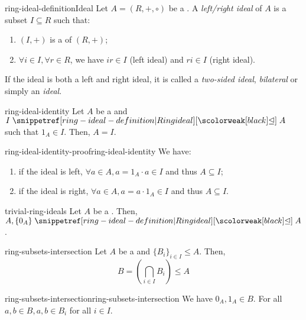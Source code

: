 \documentclass[preview]{standalone}
\begin{document}
\begin{snippetdefinition}{ring-ideal-definition}{Ideal}
    Let \(A = (R, +, \circ)\) be a \ring.
    A \emph{left/right ideal} of \(A\) is a subset \(I \subseteq R\)
    such that:
    \begin{enumerate}
        \item \((I, +)\) is a \subgroup of \((R, +)\);
        \item \(\forall i \in I, \forall r \in R\), we have \(ir \in I\) (left ideal) and \(ri \in I\) (right ideal).
    \end{enumerate}
    If the ideal is both a left and right ideal, it is called a
    \emph{two-sided ideal}, \emph{bilateral} or simply an \emph{ideal}.
\end{snippetdefinition}


\begin{snippetproposition}{ring-ideal-identity}{}
    Let \(A\) be a \ring and \(I \idealin A\) such that \(1_A \in I\).
    Then, \(A = I\).
\end{snippetproposition}

\begin{snippetproof}{ring-ideal-identity-proof}{ring-ideal-identity}{}
    We have:
    \begin{enumerate}
        \item if the ideal is left, \(\forall a \in A, a = 1_A \cdot a \in I\) and thus \(A \subseteq I\);
        \item if the ideal is right, \(\forall a \in A, a = a \cdot 1_A \in I\) and thus \(A \subseteq I\).
    \end{enumerate}
\end{snippetproof}

\begin{snippetproposition}{trivial-ring-ideals}{}
    Let \(A\) be a \ring.
    Then, \(A, \{0_A\} \idealin A\).
\end{snippetproposition}

\begin{snippetproposition}{ring-subsets-intersection}{}
    Let \(A\) be a \ring and \(\{B_i\}_{i \in I} \leq A\).
    Then,
    \[
        B = \left(\bigcap_{i \in I} B_i\right) \leq A
    \]
\end{snippetproposition}

\begin{snippetproof}{ring-subsets-intersection}{ring-subsets-intersection}{}
    We have \(0_A, 1_A \in B\).
    For all \(a,b \in B, a,b \in B_i\) for all \(i \in I\).
\end{snippetproof}
\end{document}
